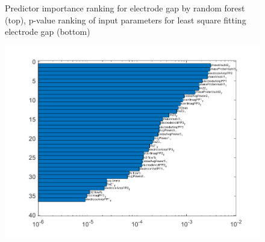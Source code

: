 \documentclass[12pt]{iopart}
\begin{document}
\begin{figure}[ht!]
\begin{center}
\begin{minipage}{0.5\textwidth}
\end{minipage}

\caption{Predictor importance ranking for electrode gap by random forest (top),  p-value ranking of input parameters for least square fitting electrode gap  (bottom) } 

\label{Fig:gap_SV,pressure_TB,species_TB}
\end{center}
\end{figure}


\begin{figure}[ht!]
\begin{center}
\begin{minipage}{0.5\textwidth}
    \includegraphics[width=1\textwidth]{input-importance-curvature-testPressure.png}
\end{minipage}
\begin{minipage}{0.5\textwidth}

\end{minipage}
\end{center}
\end{figure}
\end{document}
